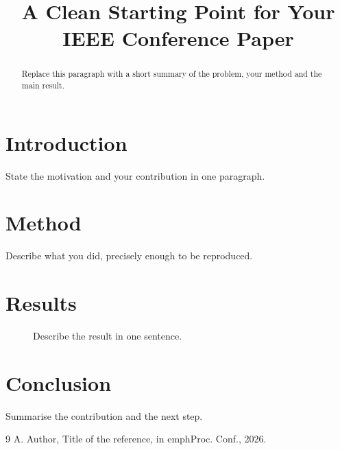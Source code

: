 \documentclass[conference]{IEEEtran}
\title{A Clean Starting Point for Your IEEE Conference Paper}
\author{\IEEEauthorblockN{Your Name}
\IEEEauthorblockA{Your Department \and your University \and you@university.edu}}
\begin{document}
\maketitle

\begin{abstract}
Replace this paragraph with a short summary of the problem, your method and
the main result.
\end{abstract}

\section{Introduction}
State the motivation and your contribution in one paragraph.

\section{Method}
Describe what you did, precisely enough to be reproduced.

\section{Results}
\begin{figure}[t]
  \centering
  \caption{Describe the result in one sentence.}
  \label{fig:result}
\end{figure}

\section{Conclusion}
Summarise the contribution and the next step.

\begin{thebibliography}{9}
A. Author, Title of the reference, in emph{Proc. Conf.}, 2026.
\end{thebibliography}
\end{document}
